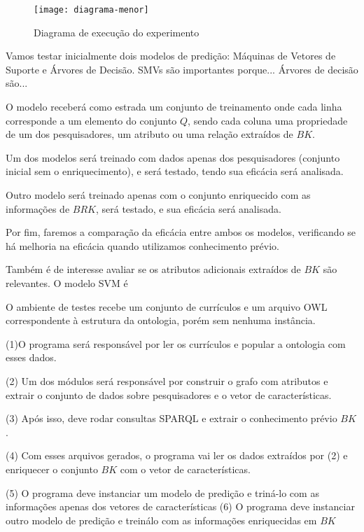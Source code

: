 \begin{figure}[!h]
  \centering
  \texttt{[image: diagrama-menor]}
  \caption{Diagrama de execução do experimento}
  \label{fig:diagrama-experimento}
\end{figure}


Vamos testar inicialmente dois modelos de predição: Máquinas de Vetores de Suporte e Árvores de Decisão.
SMVs são importantes porque...
Árvores de decisão são...

O modelo receberá como estrada um conjunto de treinamento onde cada linha corresponde a um elemento do conjunto $Q$, sendo cada coluna uma propriedade de um dos pesquisadores, um atributo ou uma relação extraídos de $BK$.

Um dos modelos será treinado com dados apenas dos pesquisadores (conjunto inicial sem o enriquecimento), e será testado, tendo sua eficácia será analisada.

Outro modelo será treinado apenas com o conjunto enriquecido com as informações de $BRK$, será testado, e sua eficácia será analisada.

Por fim, faremos a comparação da eficácia entre ambos os modelos, verificando se há melhoria na eficácia quando utilizamos conhecimento prévio.

Também é de interesse avaliar se os atributos adicionais extraídos de $BK$ são relevantes. O modelo SVM é %


O ambiente de testes recebe um conjunto de currículos e um arquivo OWL correspondente à estrutura da ontologia, porém sem nenhuma instância.

(1)O programa será responsável por ler os currículos e popular a ontologia com esses dados.

(2) Um dos módulos será responsável por construir o grafo com atributos e extrair o conjunto de dados sobre pesquisadores e o vetor de características. %

(3) Após isso, deve rodar consultas SPARQL e extrair o conhecimento prévio $BK$.

(4) Com esses arquivos gerados, o programa vai ler os dados extraídos por (2) e enriquecer o conjunto $BK$ com o vetor de características.

(5) O programa deve instanciar um modelo de predição e triná-lo com as informações apenas dos vetores de características
(6) O programa deve instanciar outro modelo de predição e treinálo com as informações enriquecidas em $BK$

